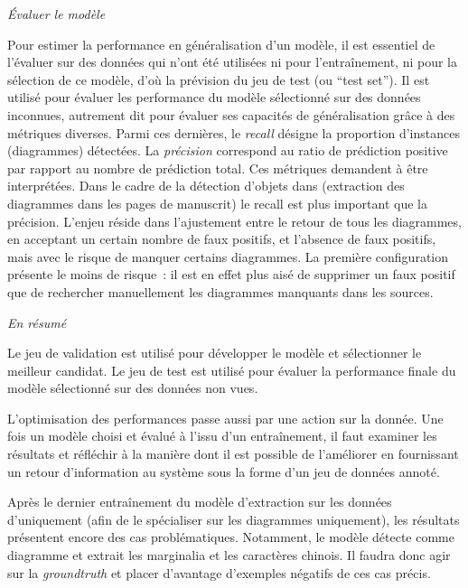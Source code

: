 \emph{Évaluer le modèle}

Pour estimer la performance en généralisation d'un modèle, il est
essentiel de l'évaluer sur des données qui n'ont été utilisées ni pour
l'entraînement, ni pour la sélection de ce modèle, d'où la prévision du
jeu de test (ou ``test set''). Il est utilisé pour évaluer les
performance du modèle sélectionné sur des données inconnues, autrement
dit pour évaluer ses capacités de généralisation grâce à des métriques
diverses. Parmi ces dernières, le \emph{recall} désigne la proportion
d'instances (diagrammes) détectées. La \emph{précision} correspond au
ratio de prédiction positive par rapport au nombre de prédiction total.
Ces métriques demandent à être interprétées.
Dans le cadre de la détection d'objets dans \eida (extraction des
diagrammes dans les pages de manuscrit) le recall est plus important que
la précision. L'enjeu réside dans l'ajustement entre le retour de tous
les diagrammes, en acceptant un certain nombre de faux positifs, et
l'absence de faux positifs, mais avec le risque de manquer certains
diagrammes. La première configuration présente le moins de risque~: il
est en effet plus aisé de supprimer un faux positif que de rechercher
manuellement les diagrammes manquants dans les sources.

\emph{En résumé}

Le jeu de validation est utilisé pour développer le modèle et
sélectionner le meilleur candidat. Le jeu de test est utilisé pour
évaluer la performance finale du modèle sélectionné sur des données non
vues.

L'optimisation des performances passe aussi par une action sur la
donnée. Une fois un modèle choisi et évalué à l'issu d'un entraînement,
il faut examiner les résultats et réfléchir à la manière dont il est
possible de l'améliorer en fournissant un retour d'information au
système sous la forme d'un jeu de données annoté.

Après le dernier entraînement du modèle d'extraction sur les données
d'\eida uniquement (afin de le spécialiser sur les diagrammes
uniquement), les résultats présentent encore des cas problématiques.
Notamment, le modèle détecte comme diagramme et extrait les marginalia
et les caractères chinois. Il faudra donc agir sur la \textit{groundtruth} et
placer d'avantage d'exemples négatifs de ces cas précis.

